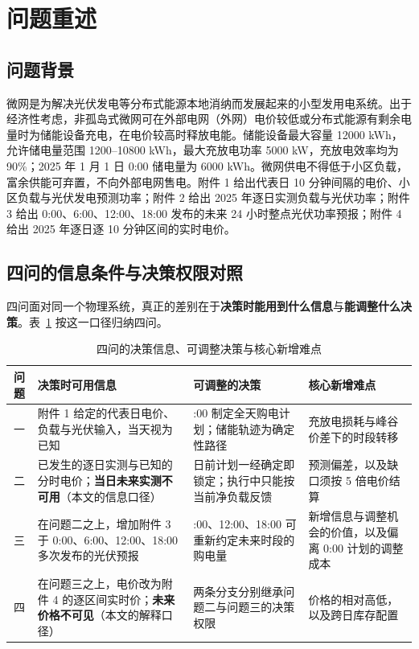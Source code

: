 
\section{问题重述}

\subsection{问题背景}

微网是为解决光伏发电等分布式能源本地消纳而发展起来的小型发用电系统。出于经济性考虑，非孤岛式微网可在外部电网（外网）电价较低或分布式能源有剩余电量时为储能设备充电，在电价较高时释放电能。储能设备最大容量 12000 kWh，允许储电量范围 1200--10800 kWh，最大充放电功率 5000 kW，充放电效率均为 90\%；2025 年 1 月 1 日 0:00 储电量为 6000 kWh。微网供电不得低于小区负载，富余供能可弃置，不向外部电网售电。附件 1 给出代表日 10 分钟间隔的电价、小区负载与光伏发电预测功率；附件 2 给出 2025 年逐日实测负载与光伏功率；附件 3 给出 0:00、6:00、12:00、18:00 发布的未来 24 小时整点光伏功率预报；附件 4 给出 2025 年逐日逐 10 分钟区间的实时电价。

\subsection{四问的信息条件与决策权限对照}

四问面对同一个物理系统，真正的差别在于\textbf{决策时能用到什么信息}与\textbf{能调整什么决策}。表~\ref{tab:restate} 按这一口径归纳四问。

\begin{table}[htbp]
  \centering
  \caption{四问的决策信息、可调整决策与核心新增难点}
  \label{tab:restate}
  \footnotesize
  \setlength{\tabcolsep}{4pt}
  \begin{tabularx}{\textwidth}{c>{\raggedright\arraybackslash}X>{\raggedright\arraybackslash}X>{\raggedright\arraybackslash}X}
    \toprule
    问题 & 决策时可用信息 & 可调整的决策 & 核心新增难点 \\
    \midrule
    一 & 附件 1 给定的代表日电价、负载与光伏输入，当天视为已知 & 0:00 制定全天购电计划；储能轨迹为确定性路径 & 充放电损耗与峰谷价差下的时段转移 \\
    二 & 已发生的逐日实测与已知的分时电价；\textbf{当日未来实测不可用}（本文的信息口径） & 日前计划一经确定即锁定；执行中只能按当前净负载反馈 & 预测偏差，以及缺口须按 5 倍电价结算 \\
    三 & 在问题二之上，增加附件 3 于 0:00、6:00、12:00、18:00 多次发布的光伏预报 & 6:00、12:00、18:00 可重新约定未来时段的购电量 & 新增信息与调整机会的价值，以及偏离 0:00 计划的调整成本 \\
    四 & 在问题三之上，电价改为附件 4 的逐区间实时价；\textbf{未来价格不可见}（本文的解释口径） & 两条分支分别继承问题二与问题三的决策权限 & 价格的相对高低，以及跨日库存配置 \\
    \bottomrule
  \end{tabularx}
\end{table}

